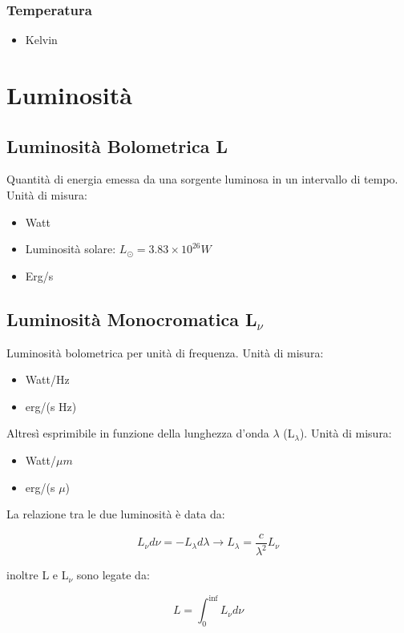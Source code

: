 \documentclass{article}
\begin{document}
\subsubsection{Temperatura}
\begin{itemize}
    \item Kelvin
\end{itemize}

\section{Luminosità}
\subsection{Luminosità Bolometrica L}
Quantità di energia emessa da una sorgente luminosa in un intervallo di tempo.
Unità di misura:
\begin{itemize}
    \item Watt
    \item Luminosità solare: $L_{\odot} = 3.83 \times 10^{26} W$
    \item Erg/s
\end{itemize}

\subsection{Luminosità Monocromatica L$_\nu$}
Luminosità bolometrica per unità di frequenza.
Unità di misura:
\begin{itemize}
    \item Watt/Hz
    \item erg/(s Hz)
\end{itemize}
Altresì esprimibile in funzione della lunghezza d'onda $\lambda$ (L$_\lambda$).
Unità di misura:
\begin{itemize}
    \item Watt/$\mu m$
    \item erg/(s $\mu $)
\end{itemize}

La relazione tra le due luminosità è data da:

\begin{equation}
    L_{\nu}d\nu = -L_{\lambda}d\lambda \rightarrow L_{\lambda}= \frac{c}{\lambda^2}L_{\nu}
\end{equation}

inoltre L e L$_\nu$ sono legate da:

\begin{equation}
    L = \int_0^{\inf} L_{\nu}d\nu
\end{equation}
\end{document}
